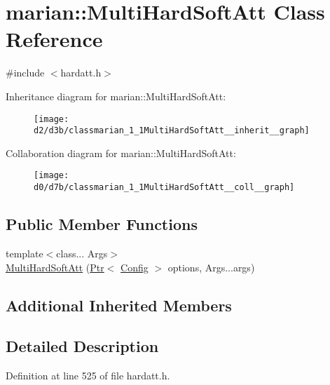 \hypertarget{classmarian_1_1MultiHardSoftAtt}{}\section{marian\+:\+:Multi\+Hard\+Soft\+Att Class Reference}
\label{classmarian_1_1MultiHardSoftAtt}


{\ttfamily \#include $<$hardatt.\+h$>$}



Inheritance diagram for marian\+:\+:Multi\+Hard\+Soft\+Att\+:
\nopagebreak
\begin{figure}[H]
\begin{center}
\leavevmode
\texttt{[image: d2/d3b/classmarian\_1\_1MultiHardSoftAtt\_\_inherit\_\_graph]}
\end{center}
\end{figure}


Collaboration diagram for marian\+:\+:Multi\+Hard\+Soft\+Att\+:
\nopagebreak
\begin{figure}[H]
\begin{center}
\leavevmode
\texttt{[image: d0/d7b/classmarian\_1\_1MultiHardSoftAtt\_\_coll\_\_graph]}
\end{center}
\end{figure}
\subsection*{Public Member Functions}
\begin{DoxyCompactItemize}
\item 
{\footnotesize template$<$class... Args$>$ }\\\hyperlink{classmarian_1_1MultiHardSoftAtt_a167619c33071c8a8fd556f63775605c5}{Multi\+Hard\+Soft\+Att} (\hyperlink{namespacemarian_ad1a373be43a00ef9ce35666145137b08}{Ptr}$<$ \hyperlink{classmarian_1_1Config}{Config} $>$ options, Args...\+args)
\end{DoxyCompactItemize}
\subsection*{Additional Inherited Members}


\subsection{Detailed Description}


Definition at line 525 of file hardatt.\+h.



